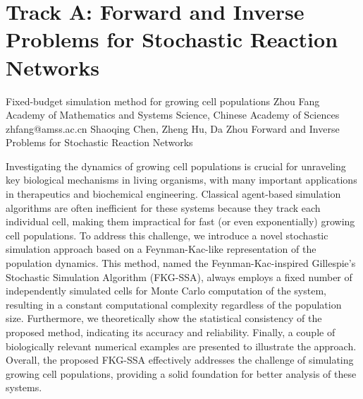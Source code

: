 \section{Track A: Forward and Inverse Problems for Stochastic Reaction Networks}\newpage

\begin{talk}
  {Fixed-budget simulation method for growing cell populations}%
  {Zhou Fang}%
  {Academy of Mathematics and Systems Science, Chinese Academy of Sciences}%
  {zhfang@amss.ac.cn}%
  {Shaoqing Chen, Zheng Hu, Da Zhou}%
  {Forward and Inverse Problems for Stochastic Reaction Networks}%
    
   
Investigating the dynamics of growing cell populations is crucial for unraveling key biological mechanisms in living organisms, with many important applications in therapeutics and biochemical engineering. Classical agent-based simulation algorithms are often inefficient for these systems because
they track each individual cell, making them impractical for fast (or even exponentially) growing
cell populations. To address this challenge, we introduce a novel stochastic simulation approach
based on a Feynman-Kac-like representation of the population dynamics. This method, named the
Feynman-Kac-inspired Gillespie’s Stochastic Simulation Algorithm (FKG-SSA), always employs a
fixed number of independently simulated cells for Monte Carlo computation of the system, resulting in a constant computational complexity regardless of the population size. Furthermore, we
theoretically show the statistical consistency of the proposed method, indicating its accuracy and
reliability. Finally, a couple of biologically relevant numerical examples are presented to illustrate the
approach. Overall, the proposed FKG-SSA effectively addresses the challenge of simulating growing
cell populations, providing a solid foundation for better analysis of these systems.


\end{talk}

